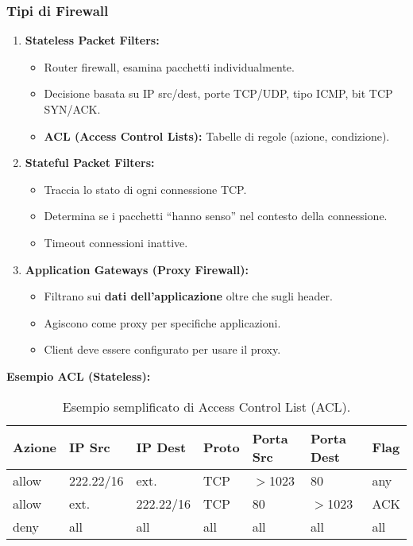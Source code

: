 \subsubsection{Tipi di Firewall}
\begin{enumerate}
    \item \textbf{Stateless Packet Filters:}
    \begin{itemize}
        \item Router firewall, esamina pacchetti individualmente.
        \item Decisione basata su IP src/dest, porte TCP/UDP, tipo ICMP, bit TCP SYN/ACK.
        \item \textbf{ACL (Access Control Lists):} Tabelle di regole (azione, condizione).
    \end{itemize}
    \item \textbf{Stateful Packet Filters:}
    \begin{itemize}
        \item Traccia lo stato di ogni connessione TCP.
        \item Determina se i pacchetti \textquotedblleft hanno senso\textquotedblright{} nel contesto della connessione.
        \item Timeout connessioni inattive.
    \end{itemize}
    \item \textbf{Application Gateways (Proxy Firewall):}
    \begin{itemize}
        \item Filtrano sui \textbf{dati dell'applicazione} oltre che sugli header.
        \item Agiscono come proxy per specifiche applicazioni.
        \item Client deve essere configurato per usare il proxy.
    \end{itemize}
\end{enumerate}
\textbf{Esempio ACL (Stateless):}
\begin{table}[H]
    \centering
    \begin{tabular}{|l|l|l|l|l|l|l|}
        \hline
        \textbf{Azione} & \textbf{IP Src} & \textbf{IP Dest} & \textbf{Proto} & \textbf{Porta Src} & \textbf{Porta Dest} & \textbf{Flag} \\ \hline
        allow & 222.22/16 & ext. & TCP & $>$1023 & 80 & any \\ \hline
        allow & ext. & 222.22/16 & TCP & 80 & $>$1023 & ACK \\ \hline
        deny  & all & all & all & all & all & all \\ \hline
    \end{tabular}
    \caption{Esempio semplificato di Access Control List (ACL).}
\end{table}


